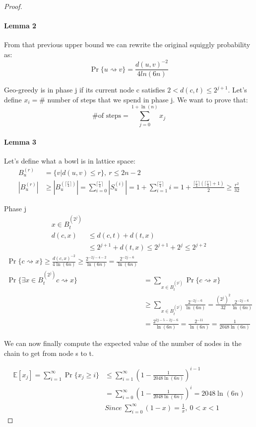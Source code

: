 \documentclass[]{article}
\begin{document}
\begin{proof}
	\paragraph{Lemma 2} From that previous upper bound we can rewrite the original squiggly probability as:
	\[
	\Pr\{u \rightsquigarrow v\} = \frac{d(u,v)^{-2}}{4ln(6n)}
	\]
	
	Geo-greedy is in phase j if its current node c satisfies $2< d(c,t) \leq 2^{j+1}$. Let's define $x_i =$\# number of steps that we spend in phase j. We want to prove that:
	\[
		\text{\# of steps} = \sum_{j=0}^{1+\ln(n)} x_j  
	\] 
	
	\paragraph{Lemma 3} Let's define what a bowl is in lattice space:
	\begin{align*}
	B_u^{(r)} &= \{v | d(u,v) \leq r\},\ r\leq 2n - 2\\
	|B_u^{(r)}| &\geq |B_u^{(\lceil \frac{r}{4} \rceil)}| = \sum_{i=0}^{\lceil \frac{r}{4} \rceil} |S^{(i)}_u| = 1 + \sum_{i=1}^{\lceil \frac{r}{4} \rceil}i = 1 + \frac{\lceil \frac{r}{4} \rceil(\lceil \frac{r}{4} \rceil +1)}{2} \geq \frac{r^2}{32}
	\end{align*}
	
	Phase j
	\begin{align*}
 	x \in B_t^{(2^j)}\\
	d(c, x) &\leq d(c, t) + d(t, x) \\
	&\leq 2^{j+1} + d(t,x) \leq 2^{j+1} + 2^j \leq 2^{j+2}
\end{align*}
	\begin{align*}
	\Pr\{c \rightsquigarrow x\} \geq \frac{d(c,x)^{-2}}{4\ln(6n)} \geq \frac{2^{-2j-4-2}}{\ln(6n)} = \frac{2^{-2j-6}}{\ln(6n)}\\
	\Pr\{\exists x \in B_t^{(2^j)} c \rightsquigarrow x\} &= \sum_{ x \in B_t^{(2^j)}}^{}\Pr\{c \rightsquigarrow x\}\\
	&\geq \sum_{ x \in B_t^{(2^j)}}^{} \frac{2^{-2j-6}}{\ln(6n)} = \frac{(2^j)^2}{32} \frac{2^{-2j-6}}{\ln(6n)} \\
	&= \frac{2^{2j-5-2j-6}}{\ln(6n)} = \frac{2^{-11}}{\ln(6n)} = \frac{1}{2048\ln(6n)}
	\end{align*}
	
	We can now finally compute the expected value of the number of nodes in the chain to get from node s to t.
	
	\begin{align*}
		\mathbb{E}[x_j] = \sum_{i=1}^{\infty} \Pr \{x_j \geq i \} &\leq \sum_{i=1}^{\infty} \left(1- \frac{1}{2048\ln(6n)} \right)^{i-1}\\ 
		&= \sum_{i=0}^{\infty} \left(1- \frac{1}{2048\ln(6n)} \right)^{i} = 2048\ln(6n)\\
		&\textit{Since}\ \sum_{i=0}^{\infty} (1-x) = \frac{1}{x},\ 0<x<1
	\end{align*}
	
\end{proof}
\end{document}
